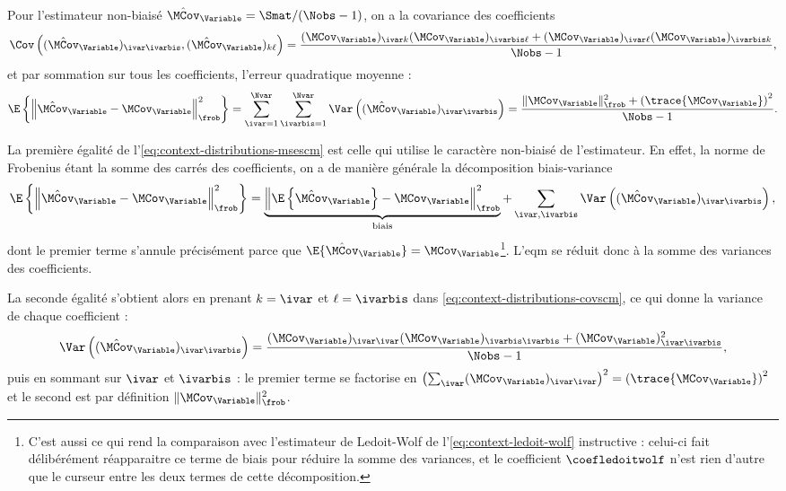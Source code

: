 \begin{proposition}
\label{prop:context-distributions-msescm}
  Pour l'estimateur non-biaisé $\hat{\MCov}_\Variable = \Smat/(\Nobs-1)$, on a la covariance des coefficients
  \begin{equation}
    \Cov\left(
      (\hat{\MCov}_\Variable)_{\ivar\ivarbis},
      (\hat{\MCov}_\Variable)_{k\ell}
    \right)
    =
    \frac{
      (\MCov_\Variable)_{\ivar k}(\MCov_\Variable)_{\ivarbis \ell}
      + (\MCov_\Variable)_{\ivar \ell}(\MCov_\Variable)_{\ivarbis k}
    }{\Nobs-1},
    \label{eq:context-distributions-covscm}
  \end{equation}
  et par sommation sur tous les coefficients, l'erreur quadratique moyenne :
  \begin{equation}
    \E\left\{
      \left\|\hat{\MCov}_\Variable - \MCov_\Variable\right\|_\frob^2
    \right\}
    =
    \sum_{\ivar=1}^{\Nvar}\sum_{\ivarbis=1}^{\Nvar}
    \Var\left((\hat{\MCov}_\Variable)_{\ivar\ivarbis}\right)
    =
    \frac{
      \|\MCov_\Variable\|_\frob^2 + \left(\trace{\MCov_\Variable}\right)^2
    }{\Nobs-1}.
    \label{eq:context-distributions-msescm}
  \end{equation}
\end{proposition}

\begin{remark}
  La première égalité de l'\cref{eq:context-distributions-msescm} est celle qui utilise le caractère non-biaisé de l'estimateur. En effet, la norme de Frobenius étant la somme des carrés des coefficients, on a de manière générale la décomposition biais-variance
  $$
    \E\left\{\left\|\hat{\MCov}_\Variable - \MCov_\Variable\right\|_\frob^2\right\}
    =
    \underbrace{
      \left\|\E\left\{\hat{\MCov}_\Variable\right\} - \MCov_\Variable\right\|_\frob^2
    }_{\text{biais}}
    +
    \sum_{\ivar,\ivarbis}
    \Var\left((\hat{\MCov}_\Variable)_{\ivar\ivarbis}\right),
  $$
  dont le premier terme s'annule précisément parce que $\E\{\hat{\MCov}_\Variable\}=\MCov_\Variable$\footnote{C'est aussi ce qui rend la comparaison avec l'estimateur de Ledoit-Wolf de l'\cref{eq:context-ledoit-wolf} instructive : celui-ci fait délibérément réapparaitre ce terme de biais pour réduire la somme des variances, et le coefficient $\coefledoitwolf$ n'est rien d'autre que le curseur entre les deux termes de cette décomposition.}. L'eqm se réduit donc à la somme des variances des coefficients.

  La seconde égalité s'obtient alors en prenant $k=\ivar$ et $\ell=\ivarbis$ dans \cref{eq:context-distributions-covscm}, ce qui donne la variance de chaque coefficient :
  $$
    \Var\left((\hat{\MCov}_\Variable)_{\ivar\ivarbis}\right)
    =
    \frac{
      (\MCov_\Variable)_{\ivar\ivar}(\MCov_\Variable)_{\ivarbis\ivarbis}
      + (\MCov_\Variable)_{\ivar\ivarbis}^2
    }{\Nobs-1},
  $$
  puis en sommant sur $\ivar$ et $\ivarbis$ : le premier terme se factorise en $\left(\sum_\ivar (\MCov_\Variable)_{\ivar\ivar}\right)^2 = \left(\trace{\MCov_\Variable}\right)^2$ et le second est par définition $\|\MCov_\Variable\|_\frob^2$.
\end{remark}

